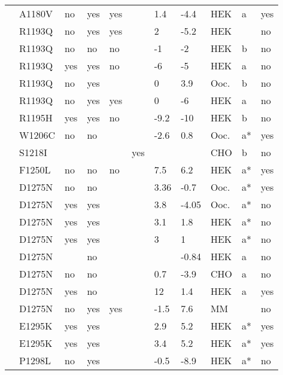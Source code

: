 \begin{tiny}
\begin{longtable}{p{4cm}|l|llll|ll|lll}
\citet{Ge2008MutationDB} & A1180V & no & yes & yes &  & 1.4 & -4.4 & HEK & a & yes \\
\citet{Huang2006MutationDB} & R1193Q & no & yes & yes &  & 2 & -5.2 & HEK &  & no \\
\citet{Tan2005MutationDB} & R1193Q & no & no & no &  & -1 & -2 & HEK & b & no \\
\citet{Tan2005MutationDB} & R1193Q & yes & yes & no &  & -6 & -5 & HEK & a & no \\
\citet{Vatta2002bMutationDB} & R1193Q & no & yes &  &  & 0 & 3.9 & Ooc. & b & no \\
\citet{Wang2004MutationDB} & R1193Q & no & yes & yes &  & 0 & -6 & HEK & a & no \\
\citet{MedeirosDomingo2009MutationDB} & R1195H & yes & yes & no &  & -9.2 & -10 & HEK & b & no \\
\citet{Albert2008MutationDB} & W1206C & no & no &  &  & -2.6 & 0.8 & Ooc. & a* & yes \\
\citet{Calloe2013MutationDB} & S1218I &  &  &  & yes &  &  & CHO & b & no \\
\citet{Yang2002MutationDB} & F1250L & no & no & no &  & 7.5 & 6.2 & HEK & a* & yes \\
\citet{Groenewegen2003aMutationDB} & D1275N & no & no &  &  & 3.36 & -0.7 & Ooc. & a* & yes \\
\citet{Groenewegen2003aMutationDB} & D1275N & yes & yes &  &  & 3.8 & -4.05 & Ooc. & a* & no \\
\citet{Gui2010aMutationDB} & D1275N & yes & yes &  &  & 3.1 & 1.8 & HEK & a* & no \\
\citet{Gui2010bMutationDB} & D1275N & yes & yes &  &  & 3 & 1 & HEK & a* & no \\
\citet{Hoshi2014MutationDB} & D1275N &  & no &  &  &  & -0.84 & HEK & a & no \\
\citet{Watanabe2011bMutationDB} & D1275N & no & no &  &  & 0.7 & -3.9 & CHO & a & no \\
\citet{Watanabe2011bMutationDB} & D1275N & yes & no &  &  & 12 & 1.4 & HEK & a & yes \\
\citet{Watanabe2011bMutationDB} & D1275N & no & yes & yes &  & -1.5 & 7.6 & MM &  & no \\
\citet{Abriel2001MutationDB} & E1295K & yes & yes &  &  & 2.9 & 5.2 & HEK & a* & yes \\
\citet{Liu2002MutationDB} & E1295K & yes & yes &  &  & 3.4 & 5.2 & HEK & a* & yes \\
\citet{Gui2010aMutationDB} & P1298L & no & yes &  &  & -0.5 & -8.9 & HEK & a* & no \\

\end{longtable}
\end{tiny}
